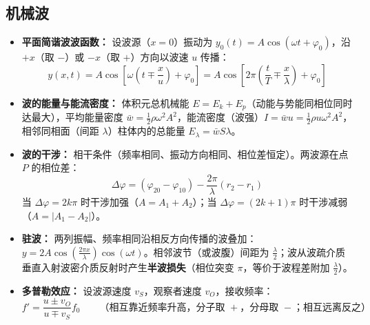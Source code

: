 \documentclass[zihao=5,a4paper,UTF8]{ctexart}
\begin{document}
\subsection{机械波}

\begin{formulabox}
\begin{itemize}
    \item \textbf{平面简谐波波函数：} 设波源（$x=0$）振动为 $y_0(t) = A\cos(\omega t + \varphi_0)$，沿 $+x$（取 $-$）或 $-x$（取 $+$）方向以波速 $u$ 传播：
    \[
        y(x,t) = A\cos\left[\omega\left(t \mp \frac{x}{u}\right) + \varphi_0\right] = A\cos\left[2\pi\left(\frac{t}{T} \mp \frac{x}{\lambda}\right) + \varphi_0\right]
    \]
    \item \textbf{波的能量与能流密度：} 体积元总机械能 $E = E_k + E_p$（动能与势能同相位同时达最大），平均能量密度 $\bar{w} = \frac{1}{2}\rho\omega^2 A^2$，能流密度（波强）$I = \bar{w}u = \frac{1}{2}\rho u\omega^2 A^2$，相邻同相面（间距 $\lambda$）柱体内的总能量 $E_{\lambda} = \bar{w} S \lambda$。
    \item \textbf{波的干涉：} 相干条件（频率相同、振动方向相同、相位差恒定）。两波源在点 $P$ 的相位差：
    \[
        \Delta\varphi = (\varphi_{20} - \varphi_{10}) - \frac{2\pi}{\lambda}(r_2 - r_1)
    \]
    当 $\Delta\varphi = 2k\pi$ 时干涉加强（$A = A_1 + A_2$）；当 $\Delta\varphi = (2k+1)\pi$ 时干涉减弱（$A = |A_1 - A_2|$）。
    \item \textbf{驻波：} 两列振幅、频率相同沿相反方向传播的波叠加：$y = 2A\cos\left(\frac{2\pi x}{\lambda}\right)\cos(\omega t)$。相邻波节（或波腹）间距为 $\frac{\lambda}{2}$；波从波疏介质垂直入射波密介质反射时产生\textbf{半波损失}（相位突变 $\pi$，等价于波程差附加 $\frac{\lambda}{2}$）。
    \item \textbf{多普勒效应：} 设波源速度 $v_S$，观察者速度 $v_O$，接收频率：
    \[
        f' = \frac{u \pm v_O}{u \mp v_S} f_0 \qquad \text{（相互靠近频率升高，分子取 $+$，分母取 $-$；相互远离反之）}
    \]
\end{itemize}
\end{formulabox}
\end{document}
